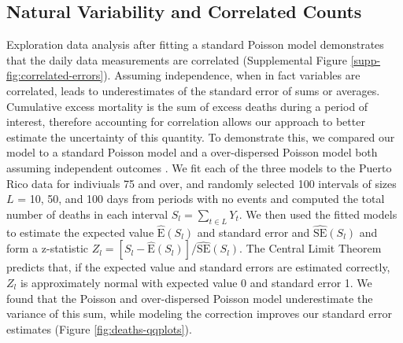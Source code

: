 \documentclass[11pt]{article}
\begin{document}
\subsection{Natural Variability and Correlated Counts}
\label{subsec:natural-variability}
Exploration data analysis after fitting a standard Poisson model demonstrates that the daily data measurements are correlated (Supplemental Figure \ref{supp-fig:correlated-errors}). Assuming independence, when in fact variables are correlated, leads to underestimates of the standard error of sums or averages. Cumulative excess mortality is the sum of excess deaths during a period of interest, therefore accounting for correlation allows our approach to better estimate the uncertainty of this quantity. To demonstrate this, we compared our model to a standard Poisson model and a over-dispersed Poisson model both assuming independent outcomes \cite{farrington1996statistical,hohle2008count,noufaily2013improved,salmon2016monitoring}. We fit each of the three models to the Puerto Rico data for indiviuals 75 and over, and randomly selected 100 intervals of sizes $L$ = 10, 50, and 100 days from periods with no events and computed the total number of deaths in each interval $S_l = \sum_{t \in L} Y_t$. We then used the fitted models to estimate the expected value $\hat{\mbox{E}}(S_l)$ and standard error  and $\hat{\mbox{SE}}(S_l)$ and form a z-statistic $Z_l = [S_l - \hat{\mbox{E}}(S_l)]/\hat{\mbox{SE}}(S_l)$. The Central Limit Theorem predicts that, if the expected value and standard errors are estimated correctly, $Z_l$ is approximately normal with expected value 0 and standard error 1. We found that the Poisson and over-dispersed Poisson model underestimate the variance of this sum, while modeling the correction improves our standard error estimates (Figure \ref{fig:deaths-qqplots}). 
\end{document}
